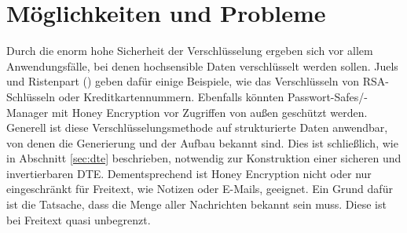 \documentclass[12pt]{scrartcl}
\begin{document}
\newpage
\section{Möglichkeiten und Probleme}
\label{sec:probleme}
Durch die enorm hohe Sicherheit der Verschlüsselung ergeben sich vor allem Anwendungsfälle, bei denen hochsensible Daten verschlüsselt werden sollen. Juels und Ristenpart (\cite{EURO2014, IEEE2014}) geben dafür einige Beispiele, wie das Verschlüsseln von RSA-Schlüsseln oder Kreditkartennummern. Ebenfalls könnten Passwort-Safes/-Manager mit Honey Encryption vor Zugriffen von außen geschützt werden. Generell ist diese Verschlüsselungsmethode auf strukturierte Daten anwendbar, von denen die Generierung und der Aufbau bekannt sind. Dies ist schließlich, wie in Abschnitt \ref{sec:dte} beschrieben, notwendig zur Konstruktion einer sicheren und invertierbaren DTE. Dementsprechend ist Honey Encryption nicht oder nur eingeschränkt für Freitext, wie Notizen oder E-Mails, geeignet. Ein Grund dafür ist die Tatsache, dass die Menge aller Nachrichten bekannt sein muss. Diese ist bei Freitext quasi unbegrenzt.
\end{document}
